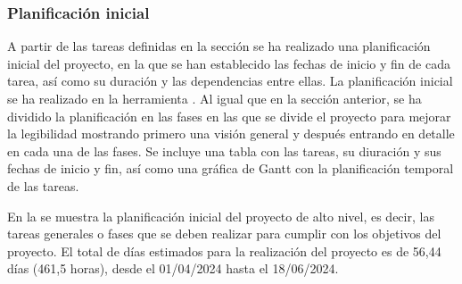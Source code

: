 \subsubsection{Planificación inicial} \label{sec:5-Planificacion-inicial}
\hypertarget{sec:5-Planificacion-inicial}{}
A partir de las tareas definidas en la sección  se ha realizado una planificación inicial del proyecto, en la que se han establecido las fechas de inicio y fin de cada tarea, así como su duración y las dependencias entre ellas. 
La planificación inicial se ha realizado en la herramienta .
Al igual que en la sección anterior, se ha dividido la planificación en las fases en las que se divide el proyecto para mejorar la legibilidad mostrando primero una visión general y después entrando en detalle en cada una de las fases.
Se incluye una tabla con las tareas, su diuración y sus fechas de inicio y fin, así como una gráfica de Gantt con la planificación temporal de las tareas.

En la  se muestra la planificación inicial del proyecto de alto nivel, es decir, las tareas generales o fases que se deben realizar para cumplir con los objetivos del proyecto.
El total de días estimados para la realización del proyecto es de 56,44 días (461,5 horas), desde el 01/04/2024 hasta el 18/06/2024.


